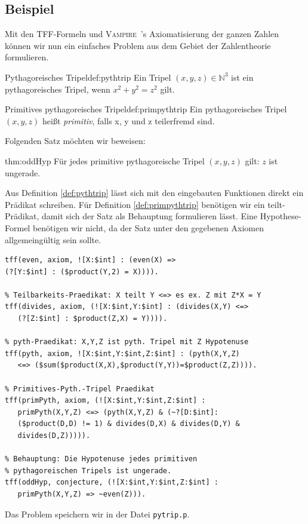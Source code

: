 \documentclass{article}
\newcommand{\vampire}{\textsc{Vampire}~}
\begin{document}
\subsection{Beispiel}
\label{subsec:tptpexample}

Mit den TFF-Formeln und \vampire's Axiomatisierung der ganzen Zahlen können wir nun 
ein einfaches Problem aus dem Gebiet der Zahlentheorie formulieren.

\begin{definition}{Pythagoreisches Tripel}{def:pythtrip}
	Ein Tripel $(x, y, z) \in \mathds{N}^3$ ist ein pythagoreisches Tripel, wenn
	$x^2+y^2=z^2$ gilt.
\end{definition}
\begin{definition}{Primitives pythagoreisches Tripel}{def:primpythtrip}
	Ein pythagoreisches Tripel $(x, y, z)$ heißt \emph{primitiv}, falls x, y und z teilerfremd sind.
\end{definition}
Folgenden Satz möchten wir beweisen:
\begin{theorem}{}{thm:oddHyp}
	Für jedes primitive pythagoreische Tripel $(x, y, z)$ gilt: $z$ ist ungerade.
\end{theorem}
Aus Definition \ref{def:pythtrip} lässt sich mit den eingebauten Funktionen direkt ein Prädikat schreiben.
Für Definition \ref{def:primpythtrip} benötigen wir ein teilt-Prädikat, damit sich der Satz als Behauptung formulieren lässt. 
Eine Hypothese-Formel benötigen wir nicht, da der Satz unter den gegebenen Axiomen allgemeingültig sein sollte.
\begin{lstlisting}[language=tptp]
% even-Praedikat: X ist gerade
tff(even, axiom, ![X:$int] : (even(X) =>
(?[Y:$int] : ($product(Y,2) = X)))).

% Teilbarkeits-Praedikat: X teilt Y <=> es ex. Z mit Z*X = Y
tff(divides, axiom, (![X:$int,Y:$int] : (divides(X,Y) <=>
   (?[Z:$int] : $product(Z,X) = Y)))).

% pyth-Praedikat: X,Y,Z ist pyth. Tripel mit Z Hypotenuse
tff(pyth, axiom, ![X:$int,Y:$int,Z:$int] : (pyth(X,Y,Z)
   <=> ($sum($product(X,X),$product(Y,Y))=$product(Z,Z)))).

% Primitives-Pyth.-Tripel Praedikat
tff(primPyth, axiom, (![X:$int,Y:$int,Z:$int] : 
   primPyth(X,Y,Z) <=> (pyth(X,Y,Z) & (~?[D:$int]: 
   ($product(D,D) != 1) & divides(D,X) & divides(D,Y) & 
   divides(D,Z))))).

% Behauptung: Die Hypotenuse jedes primitiven 
% pythagoreischen Tripels ist ungerade.
tff(oddHyp, conjecture, (![X:$int,Y:$int,Z:$int] : 
   primPyth(X,Y,Z) => ~even(Z))).
\end{lstlisting}
Das Problem speichern wir in der Datei \verb|pytrip.p|.
\end{document}
